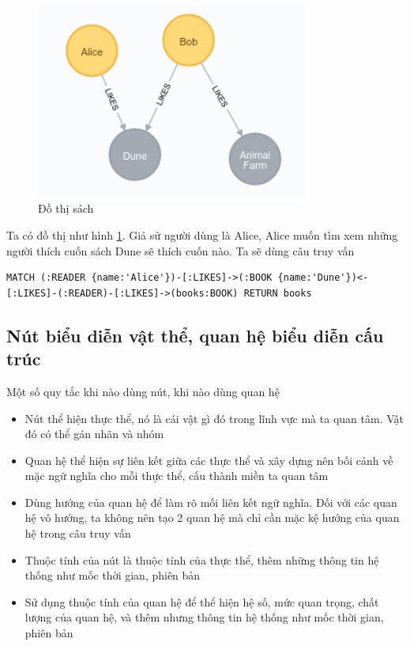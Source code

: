 \begin{figure}[h]
\centering
\includegraphics[width=0.8\textwidth]{image/bookfull.png}
\caption{\label{fig:graphbook} Đồ thị sách}
\end{figure}

Ta có đồ thị như hình \ref{fig:graphbook}. Giả sử người dùng là Alice, Alice muốn tìm xem những người thích cuốn sách Dune sẽ thích cuốn nào. Ta sẽ dùng câu truy vấn 

\begin{lstlisting}[caption={Cypher tìm người thích đọc sách tên Dune}, label={lst:cypherdune}]
MATCH (:READER {name:'Alice'})-[:LIKES]->(:BOOK {name:'Dune'})<-[:LIKES]-(:READER)-[:LIKES]->(books:BOOK) RETURN books
\end{lstlisting}

\subsection{Nút biểu diễn vật thể, quan hệ biểu diễn cấu trúc}

Một số quy tắc khi nào dùng nút, khi nào dùng quan hệ

\begin{itemize}
\item Nút thể hiện thực thể, nó là cái vật gì đó trong lĩnh vực mà ta quan tâm. Vật đó có thể gán nhãn và nhóm 
\item Quan hệ thể hiện sự liên kết giữa các thực thể và xây dựng nên bối cảnh về mặc ngữ nghĩa cho mỗi thực thể, cấu thành miền ta quan tâm
\item Dùng hướng của quan hệ để làm rõ mối liên kết ngữ nghĩa. Đối với các quan hệ vô hướng, ta không nên tạo 2 quan hệ mà chỉ cần mặc kệ hướng của quan hệ trong câu truy vấn 
\item Thuộc tính của nút là thuộc tính của thực thể, thêm những thông tin hệ thống như mốc thời gian, phiên bản 
\item Sử dụng thuộc tính của quan hệ để thể hiện hệ số, mức quan trọng, chất lượng của quan hệ, và thêm nhưng thông tin hệ thống như mốc thời gian, phiên bản 
\end{itemize}




